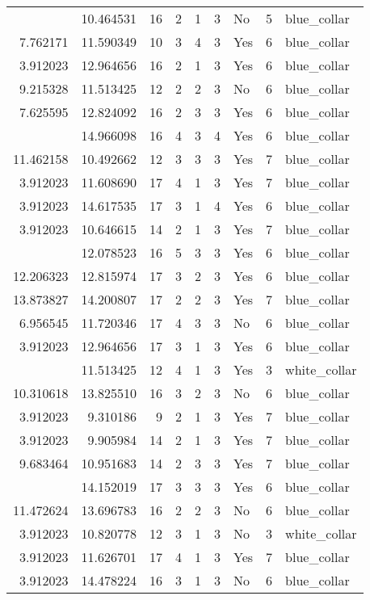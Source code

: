 \documentclass[
]{article}
\begin{document}
\begin{longtable}[t]{rrrrrllrl}
\addlinespace
3.912023 & 10.464531 & 16 & 2 & 1 & 3 & No & 5 & blue\_collar\\
7.762171 & 11.590349 & 10 & 3 & 4 & 3 & Yes & 6 & blue\_collar\\
3.912023 & 12.964656 & 16 & 2 & 1 & 3 & Yes & 6 & blue\_collar\\
9.215328 & 11.513425 & 12 & 2 & 2 & 3 & No & 6 & blue\_collar\\
7.625595 & 12.824092 & 16 & 2 & 3 & 3 & Yes & 6 & blue\_collar\\
\addlinespace
9.800901 & 14.966098 & 16 & 4 & 3 & 4 & Yes & 6 & blue\_collar\\
11.462158 & 10.492662 & 12 & 3 & 3 & 3 & Yes & 7 & blue\_collar\\
3.912023 & 11.608690 & 17 & 4 & 1 & 3 & Yes & 7 & blue\_collar\\
3.912023 & 14.617535 & 17 & 3 & 1 & 4 & Yes & 6 & blue\_collar\\
3.912023 & 10.646615 & 14 & 2 & 1 & 3 & Yes & 7 & blue\_collar\\
\addlinespace
9.110520 & 12.078523 & 16 & 5 & 3 & 3 & Yes & 6 & blue\_collar\\
12.206323 & 12.815974 & 17 & 3 & 2 & 3 & Yes & 6 & blue\_collar\\
13.873827 & 14.200807 & 17 & 2 & 2 & 3 & Yes & 7 & blue\_collar\\
6.956545 & 11.720346 & 17 & 4 & 3 & 3 & No & 6 & blue\_collar\\
3.912023 & 12.964656 & 17 & 3 & 1 & 3 & Yes & 6 & blue\_collar\\
\addlinespace
3.912023 & 11.513425 & 12 & 4 & 1 & 3 & Yes & 3 & white\_collar\\
10.310618 & 13.825510 & 16 & 3 & 2 & 3 & No & 6 & blue\_collar\\
3.912023 & 9.310186 & 9 & 2 & 1 & 3 & Yes & 7 & blue\_collar\\
3.912023 & 9.905984 & 14 & 2 & 1 & 3 & Yes & 7 & blue\_collar\\
9.683464 & 10.951683 & 14 & 2 & 3 & 3 & Yes & 7 & blue\_collar\\
\addlinespace
14.648441 & 14.152019 & 17 & 3 & 3 & 3 & Yes & 6 & blue\_collar\\
11.472624 & 13.696783 & 16 & 2 & 2 & 3 & No & 6 & blue\_collar\\
3.912023 & 10.820778 & 12 & 3 & 1 & 3 & No & 3 & white\_collar\\
3.912023 & 11.626701 & 17 & 4 & 1 & 3 & Yes & 7 & blue\_collar\\
3.912023 & 14.478224 & 16 & 3 & 1 & 3 & No & 6 & blue\_collar\\

\end{longtable}
\end{document}
